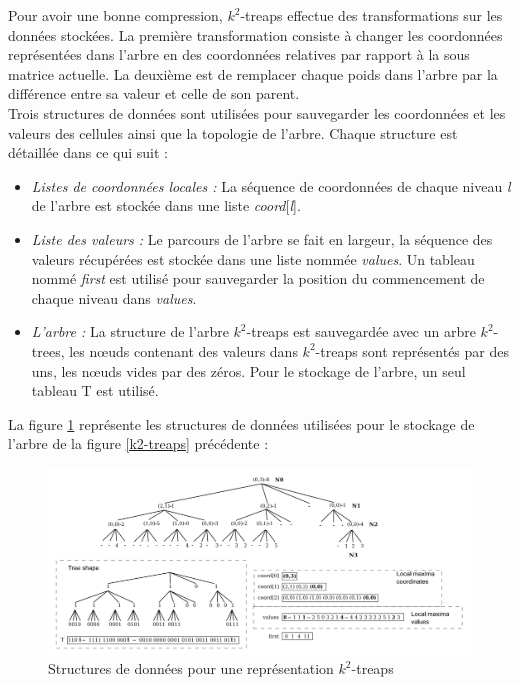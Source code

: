 Pour avoir une bonne compression, $k^2$-treaps effectue des transformations sur les données stockées. La première transformation consiste à changer les coordonnées représentées dans l'arbre en des coordonnées relatives par rapport à la sous matrice actuelle. La deuxième est de remplacer chaque poids dans l'arbre par la différence entre sa valeur et celle de son parent.\\
Trois structures de données sont utilisées pour sauvegarder les coordonnées et les valeurs des cellules ainsi que la topologie de l'arbre. Chaque structure est détaillée dans ce qui suit :
\begin{itemize}
\item \textit{Listes de coordonnées locales :} La séquence de coordonnées de chaque niveau \textit{l} de l'arbre est stockée dans une liste \textit{coord}[\textit{l}].
\item \textit{Liste des valeurs : } Le parcours de l'arbre se fait en largeur, la séquence des valeurs récupérées est stockée dans une liste nommée \textit{values}. Un tableau nommé \textit{first} est utilisé pour sauvegarder la position du commencement de chaque niveau dans \textit{values}.
\item \textit{L'arbre :} La structure de l'arbre $k^2$-treaps est sauvegardée avec un arbre $k^2$-trees, les nœuds contenant des valeurs dans $k^2$-treaps sont représentés par des uns, les nœuds vides par des zéros. Pour le stockage de l'arbre, un seul tableau T est utilisé. 
\end{itemize}

La figure \ref{k2-treaps-structure} représente les structures de données utilisées pour le stockage de l'arbre de la figure \ref{k2-treaps} précédente \citep{badr2013traitement} :

\begin{figure}[H]
\begin{center}
\includegraphics[height=200 pt, width=380 pt]{./ressources/image/k2-treaps-structure.png} 
\end{center}
\caption{Structures de données pour une représentation $k^2$-treaps}
\label{k2-treaps-structure}
\end{figure}

